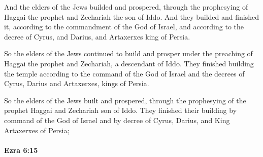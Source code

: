 			\begin{versebox}
					\item[BHS] 
					\item[LXX] 
					\item[ASV] And the elders of the Jews builded and prospered, through the prophesying of Haggai the prophet and Zechariah the son of Iddo. And they builded and finished it, according to the commandment of the God of Israel, and according to the decree of Cyrus, and Darius, and Artaxerxes king of Persia.
					\item[NIV] So the elders of the Jews continued to build and prosper under the preaching of Haggai the prophet and Zechariah, a descendant of Iddo. They finished building the temple according to the command of the God of Israel and the decrees of Cyrus, Darius and Artaxerxes, kings of Persia.
					\item[NRSV] So the elders of the Jews built and prospered, through the prophesying of the prophet Haggai and Zechariah son of Iddo. They finished their building by command of the God of Israel and by decree of Cyrus, Darius, and King Artaxerxes of Persia;
			\end{versebox}

		\paragraph{Ezra 6:15} %
			\label{EZRA-6-15}

